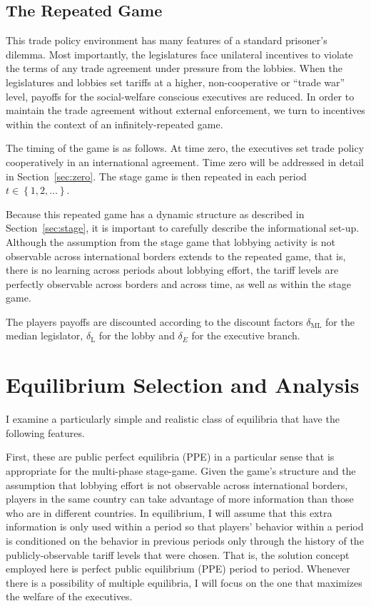 \documentclass[authoryear, review]{elsarticle}
\newcommand{\de}{\delta}
\begin{document}
\subsection{The Repeated Game}
\label{sec:repeated}
This trade policy environment has many features of a standard prisoner's dilemma. Most importantly, the legislatures face unilateral incentives to violate the terms of any trade agreement under pressure from the lobbies. When the legislatures and lobbies set tariffs at a higher, non-cooperative or ``trade war'' level, payoffs for the social-welfare conscious executives are reduced. In order to maintain the trade agreement without external enforcement, we turn to incentives within the context of an infinitely-repeated game.

The timing of the game is as follows. At time zero, the executives set trade policy cooperatively in an international agreement. Time zero will be addressed in detail in Section~\ref{sec:zero}. The stage game is then repeated in each period $t\in\left\{1,2,\ldots \right\}$.

Because this repeated game has a dynamic structure as described in Section~\ref{sec:stage}, it is important to carefully describe the informational set-up. Although the assumption from the stage game that lobbying activity is not observable across international borders extends to the repeated game, that is, there is no learning across periods about lobbying effort, the tariff levels are perfectly observable across borders and across time, as well as within the stage game.

The players payoffs are discounted according to the discount factors $\de_\text{ML}$ for the median legislator, $\de_\text{L}$ for the lobby and $\de_E$ for the executive branch.


\section{Equilibrium Selection and Analysis}
\label{sec:eqm}
I examine a particularly simple and realistic class of equilibria that have the following features.

First, these are public perfect equilibria (PPE) in a particular sense that is appropriate for the multi-phase stage-game. Given the game's structure and the assumption that lobbying effort is not observable across international borders, players in the same country can take advantage of more information than those who are in different countries. In equilibrium, I will assume that this extra information is only used within a period so that players' behavior within a period is conditioned on the behavior in previous periods only through the history of the publicly-observable tariff levels that were chosen. That is, the solution concept employed here is perfect public equilibrium (PPE) period to period. Whenever there is a possibility of multiple equilibria, I will focus on the one that maximizes the welfare of the executives. 
\end{document}

